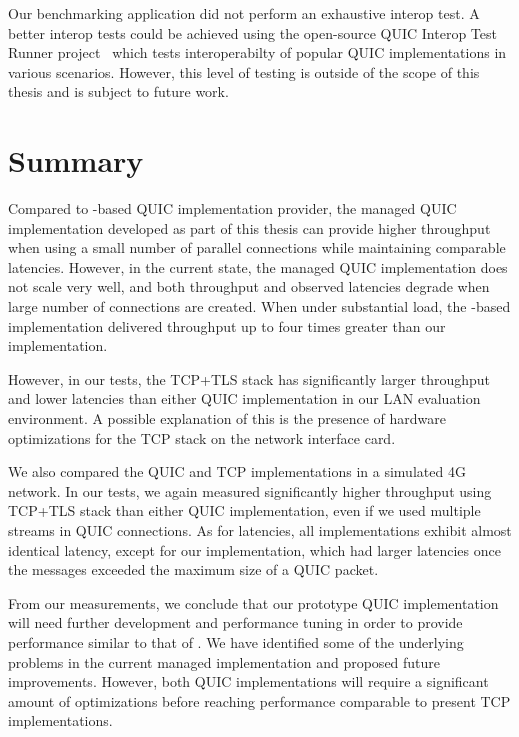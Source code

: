 Our benchmarking application did not perform an exhaustive interop test. A better interop tests
could be achieved using the open-source QUIC Interop Test Runner project~\cite{QuicInteropRunner}
which tests interoperabilty of popular QUIC implementations in various scenarios. However, this
level of testing is outside of the scope of this thesis and is subject to future work.

\section{Summary}

Compared to \libmsquic{}-based QUIC implementation provider, the managed QUIC implementation
developed as part of this thesis can provide higher throughput when using a small number of parallel
connections while maintaining comparable latencies. However, in the current state, the managed QUIC
implementation does not scale very well, and both throughput and observed latencies degrade when
large number of connections are created. When under substantial load, the \libmsquic{}-based
implementation delivered throughput up to four times greater than our implementation.

However, in our tests, the TCP+TLS stack has significantly larger throughput and lower latencies
than either QUIC implementation in our LAN evaluation environment. A possible explanation of this is
the presence of hardware optimizations for the TCP stack on the network interface card.

We also compared the QUIC and TCP implementations in a simulated 4G network. In our tests, we again
measured significantly higher throughput using TCP+TLS stack than either QUIC implementation, even
if we used multiple streams in QUIC connections. As for latencies, all implementations exhibit
almost identical latency, except for our implementation, which had larger latencies once the
messages exceeded the maximum size of a QUIC packet.

From our measurements, we conclude that our prototype QUIC implementation will need further
development and performance tuning in order to provide performance similar to that of \libmsquic{}.
We have identified some of the underlying problems in the current managed implementation and
proposed future improvements. However, both QUIC implementations will require a significant amount
of optimizations before reaching performance comparable to present TCP implementations.
